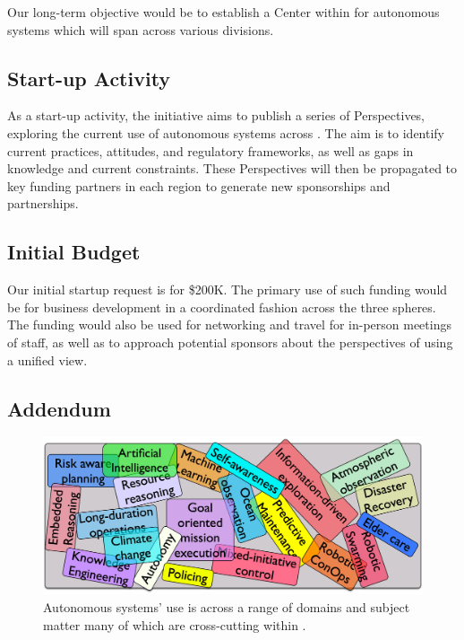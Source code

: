 \documentclass[11pt,letterpaper]{article}
\begin{document}
Our long-term objective would be to establish a Center within \org for
autonomous systems which will span across various divisions.

\subsection{Start-up Activity}
As a start-up activity, the initiative aims to publish a series of
Perspectives, exploring the current use of autonomous systems across
\auke. The aim is to identify current practices, attitudes, and
regulatory frameworks, as well as gaps in knowledge and current
constraints. These Perspectives will then be propagated to key funding
partners in each region to generate new sponsorships and partnerships.

\subsection{Initial Budget}

Our initial startup request is for \$200K. The primary use of such
funding would be for business development in a coordinated fashion
across the three spheres. The funding would also be used for
networking and travel for in-person meetings of \org staff, as well as
to approach potential sponsors about the perspectives of using a
unified view. 

\pagebreak

\subsection{Addendum}

\begin{figure}
  \vspace{-0.5cm}
  \centering
  \includegraphics[scale=0.06]{fig/word-bag.jpg}
  \caption{Autonomous systems' use is across a range of domains and
    subject matter many of which are cross-cutting within \orge.}
 \label{fig:topics}
\end{figure}
\end{document}
